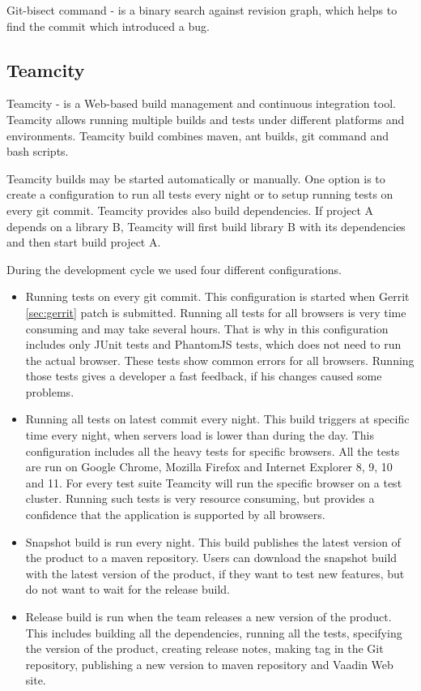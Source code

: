    Git-bisect command - is a binary search against revision graph, which helps to find the commit which
   introduced a bug.

  \subsection{Teamcity}
  Teamcity - is a Web-based build management and continuous integration tool.
  Teamcity allows running multiple builds and tests under different platforms and environments.
  Teamcity build combines maven, ant builds, git command and bash scripts.
  
  Teamcity builds may be started automatically or manually. One option is to create a configuration 
  to run all  tests every night or to setup running tests on every git commit. Teamcity
  provides also build dependencies. If project A depends on a library B,
  Teamcity will first build library B with its dependencies and then start build
  project A.
  
  During the development cycle we used four different configurations.
  \begin{itemize}
  \item Running tests on every git commit. This configuration is started when
  Gerrit \ref{sec:gerrit} patch is submitted.
   Running all tests for all browsers is very time consuming and may take several hours. 
   That is why in this configuration includes only JUnit tests and PhantomJS
   tests, which does not need to run the actual browser.
   These tests show common errors for all browsers. Running those tests gives
    a developer a fast feedback, if his changes caused some problems.
   
   \item Running all tests on latest commit every night. This build triggers at
    specific time every night, when servers load is lower than during the day.
    This configuration includes all the heavy tests for specific browsers. All
    the tests are run on Google Chrome, Mozilla Firefox and Internet Explorer 8, 9, 10 and 11. 
    For every test suite Teamcity will run the specific browser on a test
    cluster. Running such tests is very resource consuming, but provides a
    confidence that the application is supported by all browsers.
    
    \item Snapshot build is run every night. This build publishes the latest
    version of the product to a maven repository.  Users can download
    the snapshot build with the latest version of the product, if they want to
    test new features, but do not want to wait for the release build.
    
    \item Release build is run when the team releases a new version of the
    product. This includes building all the dependencies, running all the tests,
    specifying the version of the product, creating release notes, making tag in
    the Git repository, publishing a new version to maven repository and Vaadin
    Web site.
   \end{itemize}

